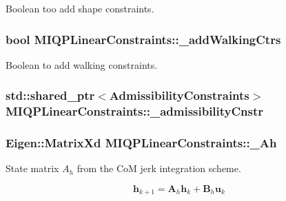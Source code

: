 \-Boolean too add shape constraints. \hypertarget{classMIQPLinearConstraints_ad1363c7fde3dd4f20adc92a7e1865579}{
\subsubsection[{\-\_\-add\-Walking\-Ctrs}]{\setlength{\rightskip}{0pt plus 5cm}bool {\bf \-M\-I\-Q\-P\-Linear\-Constraints\-::\-\_\-add\-Walking\-Ctrs}}}\label{classMIQPLinearConstraints_ad1363c7fde3dd4f20adc92a7e1865579}
\-Boolean to add walking constraints. \hypertarget{classMIQPLinearConstraints_a1ac00fe6aca254b4dd8568e199bd20a4}{
\subsubsection[{\-\_\-admissibility\-Cnstr}]{\setlength{\rightskip}{0pt plus 5cm}std\-::shared\-\_\-ptr$<${\bf \-Admissibility\-Constraints}$>$ {\bf \-M\-I\-Q\-P\-Linear\-Constraints\-::\-\_\-admissibility\-Cnstr}}}\label{classMIQPLinearConstraints_a1ac00fe6aca254b4dd8568e199bd20a4}
\hypertarget{classMIQPLinearConstraints_aacba15c9dfc1c8f88e253a4f75e422fd}{
\subsubsection[{\-\_\-\-Ah}]{\setlength{\rightskip}{0pt plus 5cm}\-Eigen\-::\-Matrix\-Xd {\bf \-M\-I\-Q\-P\-Linear\-Constraints\-::\-\_\-\-Ah}}}\label{classMIQPLinearConstraints_aacba15c9dfc1c8f88e253a4f75e422fd}
\-State matrix $A_h$ from the \-Co\-M jerk integration scheme.

\[ \mathbf{h}_{k+1} = \mathbf{A}_h \mathbf{h}_k + \mathbf{B}_h \mathbf{u}_k \]

